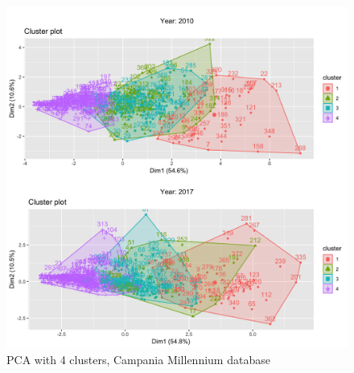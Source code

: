 \begin{figure}[h]
	\centering
	\includegraphics[scale=0.18]{../k-means/clusters-4.png}
	\caption{\small PCA with 4 clusters, Campania Millennium database}
\end{figure}
